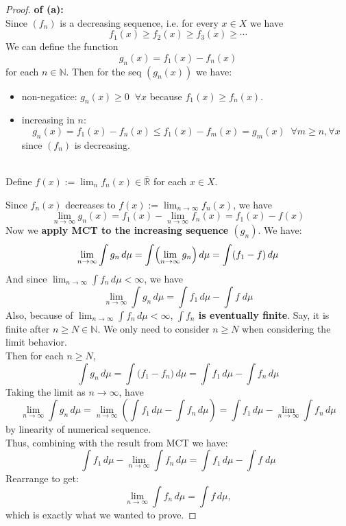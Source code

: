 \documentclass[lang=cn,11pt]{elegantbook}
\begin{document}
\begin{proof}
\textbf{of (a):}\\
Since \((f_n)\) is a decreasing sequence, i.e. for every \(x\in X\) we have
\[
f_1(x) \ge f_2(x) \ge f_3(x) \ge \cdots 
\]
We can define the function
\[
g_n(x) = f_1(x) - f_n(x)
\] for each $n \in \mathbb{N}$. Then for the seq $(g_n(x))$ we have:
\begin{itemize}
    \item non-negatice: \(g_n(x) \ge 0 \;\; \forall x\) because \(f_1(x) \ge f_n(x)\).
    \item  increasing in $n$:\[
  g_n(x) = f_1(x) - f_n(x) \le f_1(x) - f_m(x) = g_m(x) \;\;\forall  m\geq n, \forall x
  \] since \((f_n)\) is decreasing.\\\\
\end{itemize}

Define $f(x) := \lim_n f_n(x) \in \overline{\mathbb{R}}$ for each $x \in X$.

Since \(f_n(x)\) decreases to \(f(x):=\lim_{n\to\infty} f_n(x)\), we have \[
  \lim_{n\to\infty} g_n(x) = f_1(x) - \lim_{n\to\infty} f_n(x) = f_1(x) - f(x)
  \]
Now we \textbf{apply MCT to the increasing sequence \((g_n)\)}. We have:
\[
\lim_{n\to\infty} \int g_n\,d\mu = \int \Bigl(\lim_{n\to\infty} g_n\Bigr)\,d\mu = \int (f_1 - f)\,d\mu
\]
And since \(\lim_{n\to\infty}\int f_n\,d\mu < \infty\), we have\[
\lim_{n\to\infty} \int g_n\,d\mu = \int f_1 \, d\mu - \int f \;d\mu
\] Also, because of \(\lim_{n\to\infty}\int f_n\,d\mu < \infty\), \textbf{$\int f_n $ is eventually finite}. Say, it is finite after $n\geq N \in \mathbb{N}$. We only need to consider $n\geq N$ when considering the limit behavior.\\
Then for each \(n \geq N\),
\[
\int g_n\,d\mu = \int \bigl(f_1 - f_n\bigr)\,d\mu = \int f_1\,d\mu - \int f_n\,d\mu
\]
Taking the limit as \(n\to\infty\), have
\[
\lim_{n\to\infty} \int g_n\,d\mu = \lim_{n\to\infty} \left(\int f_1\,d\mu - \int f_n\,d\mu\right) = \int f_1\,d\mu - \lim_{n\to\infty} \int f_n\,d\mu
\]
by linearity of numerical sequence.\\
Thus, combining with the result from MCT we have:
\[
\int f_1\,d\mu - \lim_{n\to\infty} \int f_n\,d\mu =  \int f_1 \,d\mu- \int f \;d\mu
\]
Rearrange to get:
\[
\lim_{n\to\infty} \int f_n\,d\mu = \int f\,d\mu,
\]
which is exactly what we wanted to prove.
\end{proof}
\end{document}
